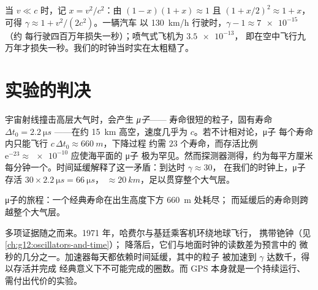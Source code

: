 \begin{remark}[日常生活为何从未察觉]\label{rem:g12:special-relativity:everyday}
当 $v \ll c$ 时，记 $x = v^2/c^2$：由 $(1-x)(1+x) \approx 1$ 且
$(1 + x/2)^2 \approx 1 + x$，可得 $\gamma \approx 1 + v^2/(2c^2)$。一辆汽车
以 \qty{130}{km/h} 行驶时，$\gamma - 1 \approx \num{7e-15}$（约
每行驶四百万年损失一秒）；喷气式飞机为 $\num{3.5e-13}$，
即在空中飞行九万年才损失一秒。我们的时钟当时实在太粗糙了。
\end{remark}

\section{实验的判决}

\begin{example}[μ子抵达地面]\label{ex:g12:special-relativity:muons}
宇宙射线撞击高层大气时，会产生 \emph{μ子}——
寿命很短的粒子，固有寿命 $\Delta t_0 = \qty{2.2}{\micro s}$
——在约 \qty{15}{km} 高空，速度几乎为 $c$。若不计相对论，μ子
每个寿命内只能飞行 $c\,\Delta t_0 \approx \qty{660}{m}$，下降过程
约需 $23$ 个寿命，而存活比例
$\mathrm{e}^{-23} \approx \num{e-10}$ 应使海平面的 μ子
极为罕见。然而探测器测得，约为每平方厘米
每分钟一个。时间延缓解释了这一矛盾：到达时 $\gamma \approx 30$，
在我们的时钟上，μ子存活 $30 \times \qty{2.2}{\micro s} = \qty{66}{\micro s}$，
 $\approx \qty{20}{km}$，足以贯穿整个大气层。
\end{example}

\begin{omfigure}

{\small μ子的旅程：一个经典寿命在出生高度下方 \qty{660}{m} 处耗尽；
而延缓后的寿命则跨越整个大气层。}
\end{omfigure}

多项证据随之而来。1971 年，哈费尔与基廷乘客机环绕地球飞行，
携带铯钟（见\cref{ch:g12:oscillators-and-time}）；
降落后，它们与地面时钟的读数差为预言中的
微秒的几分之一。加速器每天都依赖时间延缓，其中的粒子
被加速到 $\gamma$ 达数千，得以存活并完成
经典意义下不可能完成的圈数。而 GPS 本身就是一个持续运行、需付出代价的实验。

